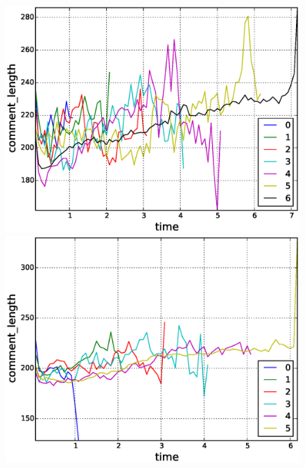 \begin{figure}[!tb]
\centering
\includegraphics[scale=0.2]{./images/avr_comment_length_for_surviving_year_for_2008.eps}
\includegraphics[scale=0.2]{./images/avr_comment_length_for_surviving_year_for_2009.eps}

\end{figure}
